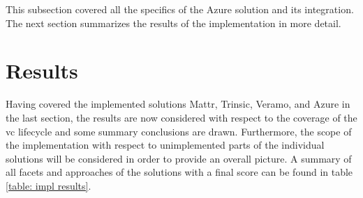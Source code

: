         This subsection covered all the specifics of the Azure solution and its integration. The next section summarizes the results of the implementation in more detail.
    
    \section{Results} %
    
     Having covered the implemented solutions Mattr, Trinsic, Veramo, and Azure in the last section, the results are now considered with respect to the coverage of the \ac{vc} lifecycle and some summary conclusions are drawn. Furthermore, the scope of the implementation with respect to unimplemented parts of the individual solutions will be considered in order to provide an overall picture. A summary of all facets and approaches of the solutions with a final score can be found in table \ref{table: impl results}.
     
